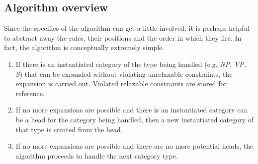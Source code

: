 \documentclass{llncs}
\newcommand{\NP}{\textit{NP}\xspace}
\newcommand{\VP}{\textit{VP}\xspace}
\newcommand{\Se}{\textit{S}\xspace}
\begin{document}
\subsection{Algorithm overview}

Since the specifics of the algorithm can get a little involved, it is perhaps helpful to abstract away the rules, their positions and the order in which they fire. In fact, the algorithm is conceptually extremely simple.

\begin{enumerate}
\item If there is an instantiated category of the type being handled (e.g. \NP, \VP, \Se) that can be expanded without violating unrelaxable constraints, the expansion is carried out. Violated relaxable constraints are stored for reference.
\item If no more expansions are possible and there is an instantiated category can be a head for the category being handled, then a new instantiated category of that type is created from the head.
\item If no more expansions are possible and there are no more potential heads, the algorithm proceeds to handle the next category type.
\end{enumerate}
\end{document}
